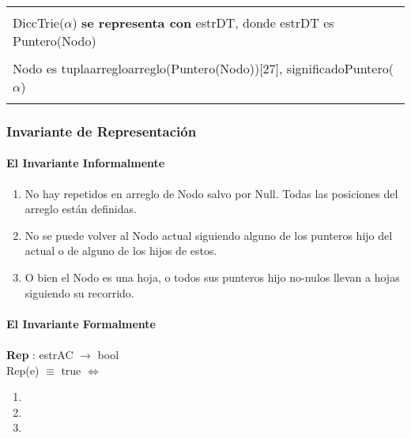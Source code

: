 \documentclass[10pt, a4paper]{article}
\begin{document}
\begin{center}
\begin{tabular}{|l|} 
\hline
\\
DiccTrie($\alpha$) \textbf{se representa con} estrDT, donde estrDT es Puntero(Nodo)\\
\\
\hspace*{6em}Nodo es tupla{{arreglo}{arreglo(Puntero(Nodo))[27]}, {significado}{Puntero($\alpha$)}}\\
\\
\hline
\end{tabular}
\end{center}


\subsubsection{Invariante de Representaci\'on}
\paragraph{El Invariante Informalmente}
\begin{enumerate}
\item No hay repetidos en arreglo de Nodo salvo por Null. Todas las posiciones del arreglo están definidas.
\item No se puede volver al Nodo actual siguiendo alguno de los punteros hijo del actual o de alguno de los hijos de estos.
\item O bien el Nodo es una hoja, o todos sus punteros hijo no-nulos llevan a hojas siguiendo su recorrido.
\end{enumerate}

\paragraph{El Invariante Formalmente}
\paragraph*{}
 
\textbf{Rep} : estrAC $\longrightarrow$ bool\\
	        Rep(e) $\equiv$ true $\Longleftrightarrow$\\
	
\begin{enumerate}
\item
\item
\item
\end{enumerate}
\end{document}
